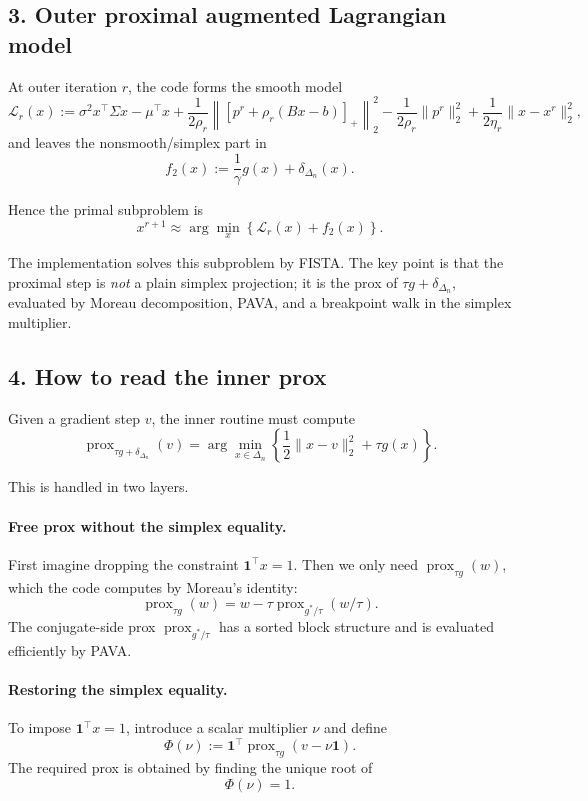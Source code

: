 \documentclass[11pt]{article}
\begin{document}
\subsection*{3. Outer proximal augmented Lagrangian model}

At outer iteration \(r\), the code forms the smooth model
\[
\mathcal{L}_r(x)
:=
\sigma^2 x^\top \Sigma x - \mu^\top x
+
\frac{1}{2\rho_r}\left\|[p^r + \rho_r(Bx-b)]_+\right\|_2^2
-
\frac{1}{2\rho_r}\|p^r\|_2^2
+
\frac{1}{2\eta_r}\|x-x^r\|_2^2,
\]
and leaves the nonsmooth/simplex part in
\[
f_2(x) := \frac{1}{\gamma} g(x) + \delta_{\Delta_n}(x).
\]

Hence the primal subproblem is
\[
x^{r+1} \approx \arg\min_x \left\{ \mathcal{L}_r(x) + f_2(x) \right\}.
\]

The implementation solves this subproblem by FISTA. The key point is that the
proximal step is \emph{not} a plain simplex projection; it is the prox of
\(\tau g + \delta_{\Delta_n}\), evaluated by Moreau decomposition, PAVA, and a
breakpoint walk in the simplex multiplier.

\subsection*{4. How to read the inner prox}

Given a gradient step \(v\), the inner routine must compute
\[
\operatorname{prox}_{\tau g + \delta_{\Delta_n}}(v)
=
\arg\min_{x \in \Delta_n}
\left\{
\frac12 \|x-v\|_2^2 + \tau g(x)
\right\}.
\]

This is handled in two layers.

\paragraph*{Free prox without the simplex equality.}
First imagine dropping the constraint \(\mathbf{1}^\top x = 1\). Then we only
need \(\operatorname{prox}_{\tau g}(w)\), which the code computes by Moreau's
identity:
\[
\operatorname{prox}_{\tau g}(w)
=
w - \tau \operatorname{prox}_{g^\ast/\tau}(w/\tau).
\]
The conjugate-side prox \(\operatorname{prox}_{g^\ast/\tau}\) has a sorted
block structure and is evaluated efficiently by PAVA.

\paragraph*{Restoring the simplex equality.}
To impose \(\mathbf{1}^\top x = 1\), introduce a scalar multiplier \(\nu\) and
define
\[
\Phi(\nu) := \mathbf{1}^\top \operatorname{prox}_{\tau g}(v - \nu \mathbf{1}).
\]
The required prox is obtained by finding the unique root of
\[
\Phi(\nu) = 1.
\]
\end{document}
